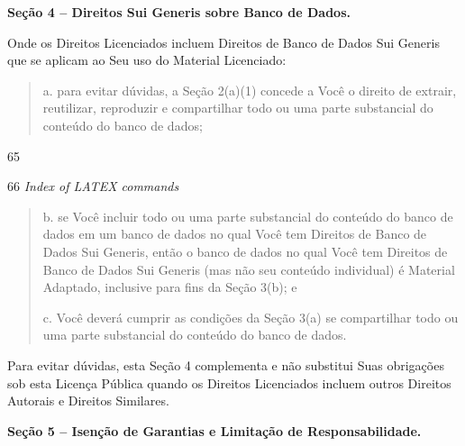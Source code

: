 \documentclass[
]{article}
\begin{document}
\textbf{Seção 4 -- Direitos Sui Generis sobre Banco de Dados.}

Onde os Direitos Licenciados incluem Direitos de Banco de Dados Sui
Generis que se aplicam ao Seu uso do Material Licenciado:

\begin{quote}
a. para evitar dúvidas, a Seção 2(a)(1) concede a Você o direito de
extrair, reutilizar, reproduzir e compartilhar todo ou uma parte
substancial do conteúdo do banco de dados;
\end{quote}

65

66 \emph{Index of LATEX commands}

\begin{quote}
b. se Você incluir todo ou uma parte substancial do conteúdo do banco de
dados em um banco de dados no qual Você tem Direitos de Banco de Dados
Sui Generis, então o banco de dados no qual Você tem Direitos de Banco
de Dados Sui Generis (mas não seu conteúdo individual) é Material
Adaptado, inclusive para fins da Seção 3(b); e

c. Você deverá cumprir as condições da Seção 3(a) se compartilhar todo
ou uma parte substancial do conteúdo do banco de dados.
\end{quote}

Para evitar dúvidas, esta Seção 4 complementa e não substitui Suas
obrigações sob esta Licença Pública quando os Direitos Licenciados
incluem outros Direitos Autorais e Direitos Similares.

\textbf{Seção 5 -- Isenção de Garantias e Limitação de
Responsabilidade.}
\end{document}
